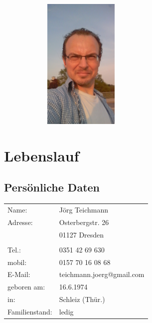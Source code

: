 \documentclass{article}
\begin{document}

\begin{figure}
    \includegraphics[width=1.5in, height=2.5in]{Image.jpeg}

\end{figure}

\section*{Lebenslauf}

\subsection*{Pers\"onliche Daten}
\begin{tabular}{lp{15cm}}
Name: 		& J\"org Teichmann\\
Adresse: 		& Osterbergstr. 26\\
	 		& 01127 Dresden\\
\\
Tel.:	 		& 0351 42 69 630 \\
mobil:      		& 0157 70 16 08 68 \\
E-Mail:  		& teichmann.joerg@gmail.com \\
geboren am: 	& 16.6.1974\\
in:	    		& Schleiz (Th\"ur.)\\
Familienstand: 	& ledig
\end{tabular}
\end{document}
